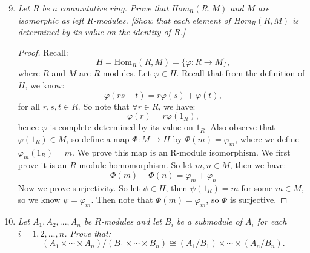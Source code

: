\documentclass[12pt]{amsbook}
\theoremstyle{plain}
\numberwithin{section}{chapter}
\numberwithin{equation}{chapter}
\theoremstyle{definition}
\theoremstyle{remark}
\renewcommand{\phi}{\varphi}
\begin{document}
\begin{enumerate}[label=\arabic*.]
\setcounter{enumi}{8}
\item \textit{Let $R$ be a commutative ring. Prove that Hom$_R(R,M)$ and $M$ are isomorphic as left $R$-modules. [Show that each element of Hom$_R(R,M)$ is determined by its value on the identity of $R$.]}

\begin{proof}
Recall:
$$
H = \text{Hom}_R(R,M) = \{\phi:R \to M\},
$$
where $R$ and $M$ are $R$-modules. Let $\phi \in H$. Recall that from the definition of $H$, we know:
$$
\phi(rs + t) = r\phi(s) + \phi(t),
$$
for all $r,s,t \in R$. So note that $\forall r \in R$, we have:
$$
\phi(r) = r\phi(1_R),
$$
hence $\phi$ is complete determined by its value on $1_R$. Also observe that $\phi(1_R) \in M$, so define a map $\Phi:M \to H$ by $\Phi(m) = \phi_m$, where we define $\phi_m(1_R) = m$. We prove this map is an R-module isomorphism. We first prove it is an $R$-module homomorphism. So let $m,n \in M$, then we have:
$$
\Phi(m) + \Phi(n) = \phi_m + \phi_n
$$
Now we prove surjectivity. So let $\psi \in H$, then $\psi(1_R) = m$ for some $m \in M$, so we know $\psi = \phi_m$. Then note that $\Phi(m) = \phi_m$, so $\Phi$ is surjective. 
\end{proof}

\setcounter{enumi}{10}
\item \textit{Let $A_1,A_2,...,A_n$ be $R$-modules and let $B_i$ be a submodule of $A_i$ for each $i = 1,2,...,n$. Prove that: 
$$
(A_1 \times \cdots \times A_n)/(B_1 \times \cdots \times B_n) \cong (A_1/B_1) \times \cdots \times (A_n/B_n).
$$}


\end{enumerate}
\end{document}
